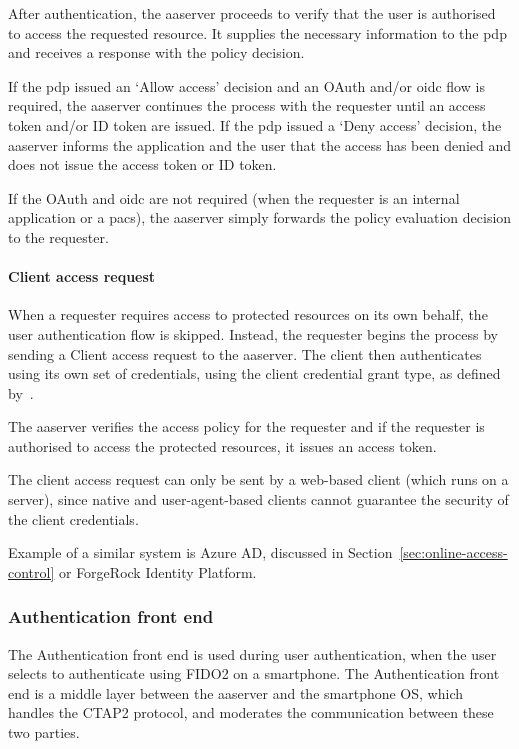 After authentication, the \acrshort{aaserver} proceeds to verify that the user is authorised to access the requested resource. It supplies the necessary information to the \acrshort{pdp} and receives a response with the policy decision.

If the \acrshort{pdp} issued an `Allow access' decision and an OAuth and/or \acrshort{oidc} flow is required, the \acrshort{aaserver} continues the process with the requester until an access token and/or ID token are issued. If the \acrshort{pdp} issued a `Deny access' decision, the \acrshort{aaserver} informs the application and the user that the access has been denied and does not issue the access token or ID token. 

If the OAuth and \acrshort{oidc} are not required (when the requester is an internal application or a \acrshort{pacs}), the \acrshort{aaserver} simply forwards the policy evaluation decision to the requester.

\paragraph{Client access request}
When a requester requires access to protected resources on its own behalf, the user authentication flow is skipped. Instead, the requester begins the process by sending a Client access request to the \acrshort{aaserver}. The client then authenticates using its own set of credentials, using the client credential grant type, as defined by~\cite{Hardt2012TheFramework}. 

The \acrshort{aaserver} verifies the access policy for the requester and if the requester is authorised to access the protected resources, it issues an access token.

The client access request can only be sent by a web-based client (which runs on a server), since native and user-agent-based clients cannot guarantee the security of the client credentials.

\bigskip \noindent
Example of a similar system is Azure AD, discussed in Section~\ref{sec:online-access-control} or ForgeRock Identity Platform\footnotemark.
% 
    
\subsubsection{Authentication front end}
The Authentication front end is used during user authentication, when the user selects to authenticate using FIDO2 on a smartphone. The Authentication front end is a middle layer between the \acrshort{aaserver} and the smartphone OS, which handles the CTAP2 protocol, and moderates the communication between these two parties.

